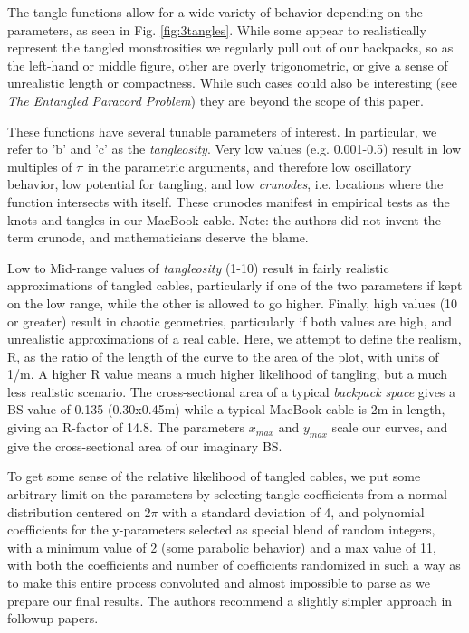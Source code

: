 \documentclass{JINST}
\begin{document}
The tangle functions allow for a wide variety of behavior depending on the parameters, as seen in Fig. \ref{fig:3tangles}. While some appear to realistically represent the tangled monstrosities we regularly pull out of our backpacks, so as the left-hand or middle figure, other are overly trigonometric, or give a sense of unrealistic length or compactness. While such cases could also be interesting (see \textit{The Entangled Paracord Problem}) they are beyond the scope of this paper.

These functions have several tunable parameters of interest. In particular, we refer to 'b' and 'c' as the \textit{tangleosity}. Very low values (e.g. 0.001-0.5) result in low multiples of $\pi$ in the parametric arguments, and therefore low oscillatory behavior, low potential for tangling, and low \textit{crunodes}, i.e. locations where the function intersects with itself. These crunodes manifest in empirical tests as the knots and tangles in our MacBook cable. Note: the authors did not invent the term crunode, and mathematicians deserve the blame.\cite{enwiki:crunode} 

Low to Mid-range values of \textit{tangleosity} (1-10) result in fairly realistic approximations of tangled cables, particularly if one of the two parameters if kept on the low range, while the other is allowed to go higher. Finally, high values (10 or greater) result in chaotic geometries, particularly if both values are high, and unrealistic approximations of a real cable. Here, we attempt to define the realism, R, as the ratio of the length of the curve to the area of the plot, with units of 1/m. A higher R value means a much higher likelihood of tangling, but a much less realistic scenario. The cross-sectional area of a typical \textit{backpack space} gives a BS value of 0.135 (0.30x0.45m) while a typical MacBook cable is 2m in length, giving an R-factor of 14.8. The parameters $x_{max}$ and $y_{max}$ scale our curves, and give the cross-sectional area of our imaginary BS. 

To get some sense of the relative likelihood of tangled cables, we put some arbitrary limit on the parameters by selecting tangle coefficients from a normal distribution centered on 2$\pi$ with a standard deviation of 4, and polynomial coefficients for the y-parameters selected as special blend of random integers, with a minimum value of 2 (some parabolic behavior) and a max value of 11, with both the coefficients and number of coefficients randomized in such a way as to make this entire process convoluted and almost impossible to parse as we prepare our final results. The authors recommend a slightly simpler approach in followup papers.
\end{document}
